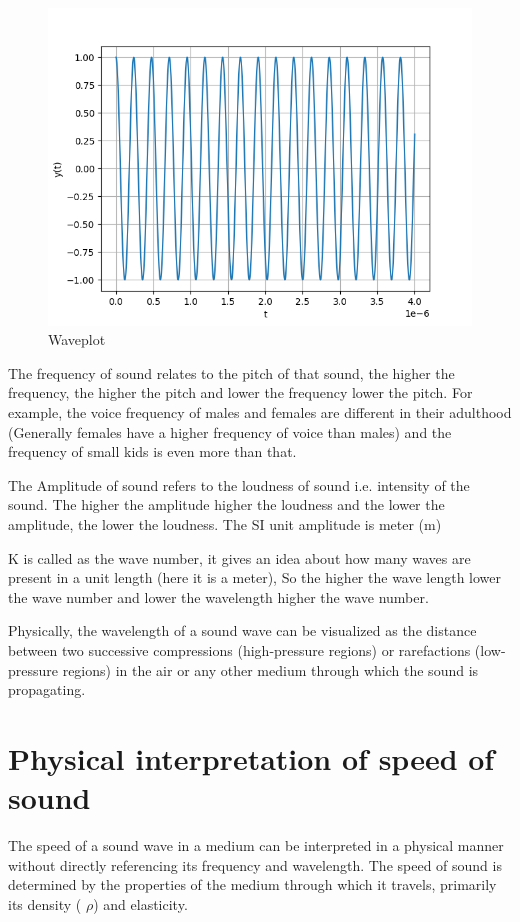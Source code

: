 \documentclass[journal,12pt,twocolumn]{IEEEtran}
\theoremstyle{remark}
\begin{document}
\\ 

\vspace{3cm}
\begin{figure}[h]
    \centering
    \includegraphics[width=\columnwidth]{images/plot.png}
    \caption{Waveplot}
    \label{fig:Plot1}
\end{figure} 
The frequency of sound relates to the pitch of that
sound, the higher the frequency, the higher the pitch
and lower the frequency lower the pitch. For
example, the voice frequency of males and females
are different in their adulthood (Generally females have a higher frequency of voice than
males) and the frequency of small kids is even
more than that.



The Amplitude of sound refers to the loudness of
sound i.e. intensity of the sound. The higher the
amplitude higher the loudness and the lower the
amplitude, the lower the loudness. The SI unit amplitude is meter (m)

K is called as the wave number, it gives an idea
about how many waves are present in a unit
length (here it is a meter), So the higher the wave
length lower the wave number and lower the
wavelength higher the wave number.

Physically, the wavelength of a sound wave
can be visualized as the distance between
two successive compressions (high-pressure regions) or rarefactions (low-pressure regions)
in the air or any other medium through which
the sound is propagating.
\section*{\Large Physical interpretation of speed of sound}
The speed of a sound wave in a medium can be interpreted in a physical manner without directly referencing its frequency and wavelength. The speed of sound is determined by the properties of the medium through which it travels, primarily its density (
$\rho$) and elasticity.\\
\end{document}
